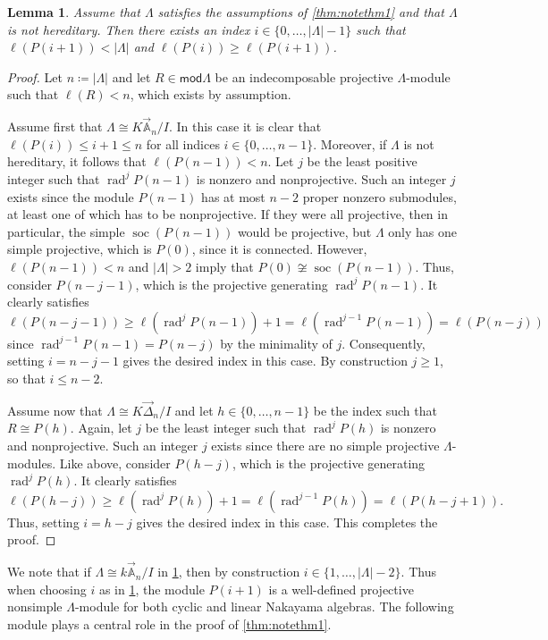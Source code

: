 \documentclass[11pt]{amsart}
\newcommand{\mods}{\mathsf{mod}}
\newcommand{\A}{\mathbb{A}}
\DeclareMathOperator{\soc}{\mathrm{soc}}
\DeclareMathOperator{\rad}{\mathrm{rad}}
\newtheorem{lemma}[theorem]{Lemma}
\theoremstyle{definition}
\begin{document}
\begin{lemma}\label{lem:specialindex}
    Assume that $\Lambda$ satisfies the assumptions of \cref{thm:notethm1} and that $\Lambda$ is not hereditary. Then there exists an index $i \in \{0, \dots, |\Lambda|-1\}$ such that $\ell(P(i+1)) < |\Lambda|$ and $\ell(P(i)) \geq \ell(P(i+1))$.
\end{lemma}
\begin{proof}
    Let $n \coloneqq |\Lambda|$ and let $R \in \mods \Lambda$ be an indecomposable projective $\Lambda$-module such that $\ell(R) < n$, which exists by assumption.
    
    Assume first that $\Lambda \cong K \overrightarrow{\A}_n /I$. In this case it is clear that $\ell(P(i)) \leq i+1 \leq n$ for all indices $i \in \{0,\dots, n-1\}$. Moreover, if $\Lambda$ is not hereditary, it follows that $\ell(P(n-1)) < n$. Let $j$ be the least positive integer such that $\rad^j P(n-1)$ is nonzero and nonprojective. Such an integer $j$ exists since the module $P(n-1)$ has at most $n-2$ proper nonzero submodules, at least one of which has to be nonprojective. If they were all projective, then in particular, the simple $\soc(P(n-1))$ would be projective, but $\Lambda$ only has one simple projective, which is $P(0)$, since it is connected. However, $\ell(P(n-1))<n$ and $|\Lambda|>2$ imply that $P(0) \not \cong \soc( P(n-1))$. Thus, consider $P(n-j-1)$, which is the projective generating $\rad^j P(n-1)$. It clearly satisfies 
    \[ \ell(P(n-j-1)) \geq \ell(\rad^{j} P(n-1)) +1 =\ell(\rad^{j-1} P(n-1)) = \ell(P(n-j)) \]
    since $\rad^{j-1} P(n-1) = P(n-j)$ by the minimality of $j$. 
    Consequently, setting $i=n-j-1$ gives the desired index in this case. By construction $j \geq 1$, so that $i \leq n-2$.

    Assume now that $\Lambda \cong K \overrightarrow{\Delta}_n /I$ and let $h \in \{0,\dots, n-1\}$ be the index such that $R \cong P(h)$. Again, let $j$ be the least integer such that $\rad^j P(h)$ is nonzero and nonprojective. Such an integer $j$ exists since there are no simple projective $\Lambda$-modules. Like above, consider $P(h-j)$, which is the projective generating $\rad^j P(h)$. It clearly satisfies 
    \[ \ell(P(h-j)) \geq \ell(\rad^j P(h)) +1 = \ell(\rad^{j-1} P(h)) = \ell(P(h-j+1)).\]
    Thus, setting $i=h-j$ gives the desired index in this case. This completes the proof.
    \end{proof}

    We note that if $\Lambda \cong k\overrightarrow{\A}_n/I$ in \cref{lem:specialindex}, then by construction $i\in \{1, \dots, |\Lambda|-2\}$. Thus when choosing $i$ as in \cref{lem:specialindex}, the module $P(i+1)$ is a well-defined projective nonsimple $\Lambda$-module for both cyclic and linear Nakayama algebras. The following module plays a central role in the proof of \cref{thm:notethm1}.
\end{document}
